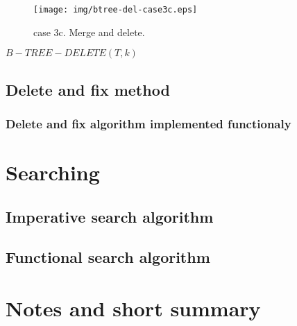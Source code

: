 \documentclass{article}
\begin{document}
\begin{figure}[htbp]
  \begin{center}
    \texttt{[image: img/btree-del-case3c.eps]}
    \caption{case 3c. Merge and delete.} \label{fig:btree-del-case3c}
  \end{center}
\end{figure}

\begin{algorithmic}
\STATE $B-TREE-DELETE(T, k)$

\end{algorithmic}



\subsection{Delete and fix method}

\subsubsection{Delete and fix algorithm implemented functionaly}

\section{Searching} 

\subsection{Imperative search algorithm}

\subsection{Functional search algorithm}

\section{Notes and short summary}
\end{document}
